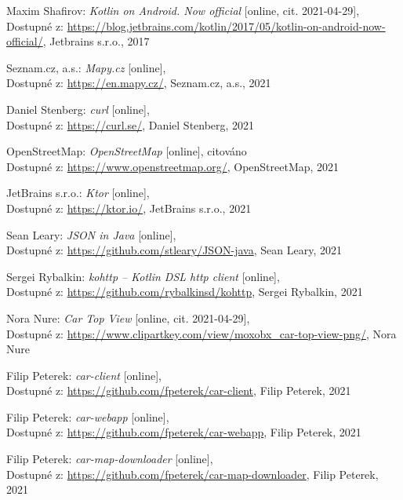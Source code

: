 \documentclass[czech, bachelor]{diploma}
\begin{document}
\begin{thebibliography}{50}
Maxim Shafirov: \textit{Kotlin on Android. Now official} [online, cit. 2021-04-29], \\
Dostupné z:
\url{https://blog.jetbrains.com/kotlin/2017/05/kotlin-on-android-now-official/},
Jetbrains s.r.o., 2017

Seznam.cz, a.s.: \textit{Mapy.cz} [online], \\
Dostupné z:
\url{https://en.mapy.cz/},
Seznam.cz, a.s., 2021

Daniel Stenberg: \textit{curl} [online], \\
Dostupné z:
\url{https://curl.se/},
Daniel Stenberg, 2021

OpenStreetMap: \textit{OpenStreetMap} [online], citováno \\
Dostupné z:
\url{https://www.openstreetmap.org/},
OpenStreetMap, 2021

JetBrains s.r.o.: \textit{Ktor} [online], \\
Dostupné z:
\url{https://ktor.io/},
JetBrains s.r.o., 2021

Sean Leary: \textit{JSON in Java} [online], \\
Dostupné z:
\url{https://github.com/stleary/JSON-java},
Sean Leary, 2021

Sergei Rybalkin: \textit{kohttp -- Kotlin DSL http client} [online], \\
Dostupné z:
\url{https://github.com/rybalkinsd/kohttp},
Sergei Rybalkin, 2021

Nora Nure: \textit{Car Top View} [online, cit. 2021-04-29], \\
Dostupné z:
\url{https://www.clipartkey.com/view/moxobx\_car-top-view-png/},
Nora Nure

Filip Peterek: \textit{car-client} [online], \\
Dostupné z:
\url{https://github.com/fpeterek/car-client},
Filip Peterek, 2021

Filip Peterek: \textit{car-webapp} [online], \\
Dostupné z:
\url{https://github.com/fpeterek/car-webapp},
Filip Peterek, 2021

Filip Peterek: \textit{car-map-downloader} [online], \\
Dostupné z:
\url{https://github.com/fpeterek/car-map-downloader},
Filip Peterek, 2021


\end{thebibliography}
\end{document}
